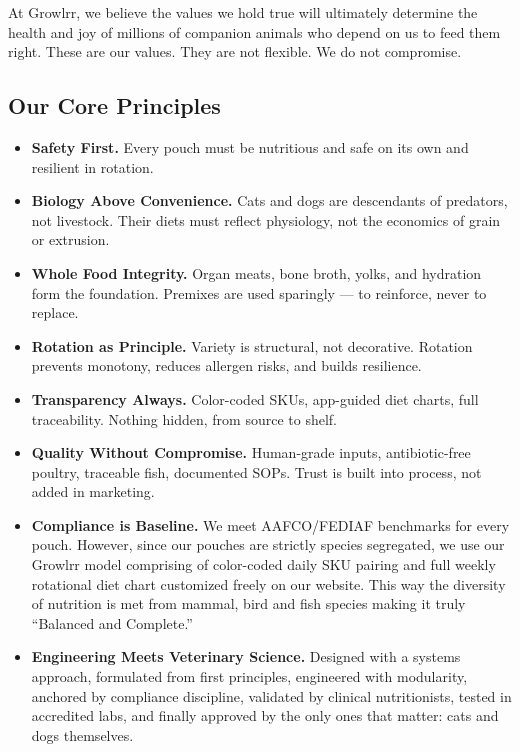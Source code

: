 At Growlrr, we believe the values we hold true will ultimately determine the health and joy of millions of companion animals who depend on us to feed them right. These are our values. They are not flexible. We do not compromise.

\subsection*{Our Core Principles}

\begin{itemize}[leftmargin=1.5em]
\item \textbf{Safety First.} Every pouch must be nutritious and safe on its own and resilient in rotation.
\item \textbf{Biology Above Convenience.} Cats and dogs are descendants of predators, not livestock. Their diets must reflect physiology, not the economics of grain or extrusion.
\item \textbf{Whole Food Integrity.} Organ meats, bone broth, yolks, and hydration form the foundation. Premixes are used sparingly --- to reinforce, never to replace.
\item \textbf{Rotation as Principle.} Variety is structural, not decorative. Rotation prevents monotony, reduces allergen risks, and builds resilience.
\item \textbf{Transparency Always.} Color-coded SKUs, app-guided diet charts, full traceability. Nothing hidden, from source to shelf.
\item \textbf{Quality Without Compromise.} Human-grade inputs, antibiotic-free poultry, traceable fish, documented SOPs. Trust is built into process, not added in marketing.
\item \textbf{Compliance is Baseline.} We meet AAFCO/FEDIAF benchmarks for every pouch. However, since our pouches are strictly species segregated, we use our Growlrr model comprising of color-coded daily SKU pairing and full weekly rotational diet chart customized freely on our website. This way the diversity of nutrition is met from mammal, bird and fish species making it truly ``Balanced and Complete.''
\item \textbf{Engineering Meets Veterinary Science.} Designed with a systems approach, formulated from first principles, engineered with modularity, anchored by compliance discipline, validated by clinical nutritionists, tested in accredited labs, and finally approved by the only ones that matter: cats and dogs themselves.
\end{itemize}

